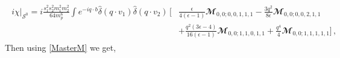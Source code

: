 \begin{align}
    \begin{split}
     i   \chi\Big|_{\mathcal{S}^0}
        =i \frac{s_1^2 s_2^2 m_1^2 m_2^2}{64 m_p^6} \int e^{-iq\cdot b}\hat\delta(q\cdot v_1)\hat\delta(q\cdot v_2)\,\Bigg[&\frac{\epsilon }{4 (\epsilon -1)}\mathbfcal{M}_{0,0;0,0,1,1,1}-\frac{3 q^2}{8 \epsilon }\mathbfcal{M}_{0,0;0,0,2,1,1}\\&+\frac{q^2 (3 \epsilon -4)}{16 (\epsilon -1)}\mathbfcal{M}_{0,0;1,1,0,1,1}+\frac{q^4}{4}\mathbfcal{M}_{0,0;1,1,1,1,1}\Bigg]\,,
    \end{split}
\end{align}
Then using \eqref{MasterM} we get,

